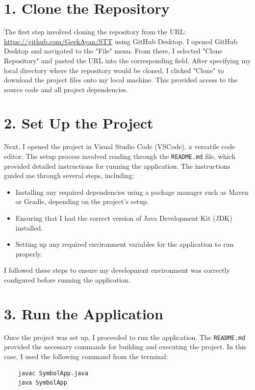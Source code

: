 \documentclass[12pt, a4paper]{article}
\begin{document}
\section*{1. Clone the Repository}
The first step involved cloning the repository from the URL: \url{https://github.com/GeekAyan/STT} using GitHub Desktop. 
I opened GitHub Desktop and navigated to the "File" menu. From there, I selected "Clone Repository" and pasted the URL into the corresponding field. After specifying my local directory where the repository would be cloned, I clicked "Clone" to download the project files onto my local machine. This provided access to the source code and all project dependencies.

\section*{2. Set Up the Project}
Next, I opened the project in Visual Studio Code (VSCode), a versatile code editor. The setup process involved reading through the \texttt{README.md} file, which provided detailed instructions for running the application. The instructions guided me through several steps, including:
\begin{itemize}
    \item Installing any required dependencies using a package manager such as Maven or Gradle, depending on the project's setup.
    \item Ensuring that I had the correct version of Java Development Kit (JDK) installed.
    \item Setting up any required environment variables for the application to run properly.
\end{itemize}
I followed these steps to ensure my development environment was correctly configured before running the application.
\section*{3. Run the Application}
Once the project was set up, I proceeded to run the application. The \texttt{README.md} provided the necessary commands for building and executing the project. In this case, I used the following command from the terminal:
\begin{verbatim}
    javac SymbolApp.java
    java SymbolApp
\end{verbatim}
\newpage
{}
\vspace{-1.2cm}
\end{document}
